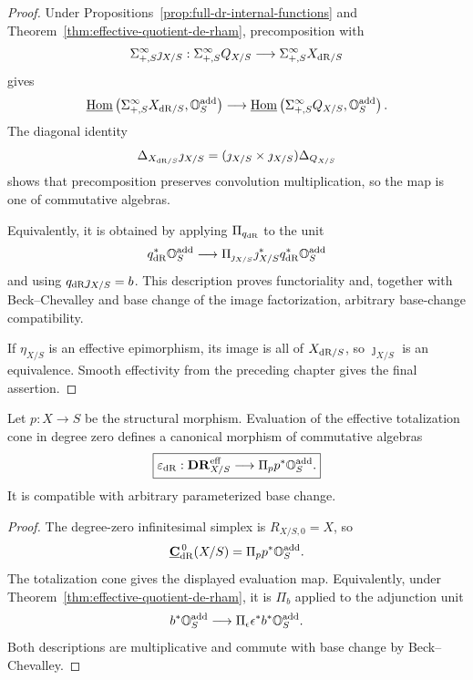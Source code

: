 \begin{proof}
Under Propositions~\ref{prop:full-dr-internal-functions} and
Theorem~\ref{thm:effective-quotient-de-rham}, precomposition with
\[
    \Sigma^\infty_{+,S}\jmath_{X/S}:
    \Sigma^\infty_{+,S}Q_{X/S}
    \longrightarrow
    \Sigma^\infty_{+,S}X_{\mathrm{dR}/S}
\]
gives
\[
    \underline{\operatorname{Hom}}
    \left(
        \Sigma^\infty_{+,S}X_{\mathrm{dR}/S},\mathbb O_S^{\mathrm{add}}
    \right)
    \longrightarrow
    \underline{\operatorname{Hom}}
    \left(
        \Sigma^\infty_{+,S}Q_{X/S},\mathbb O_S^{\mathrm{add}}
    \right).
\]
The diagonal identity
\[
    \Delta_{X_{\mathrm{dR}/S}}\jmath_{X/S}
    =
    (\jmath_{X/S}\times\jmath_{X/S})\Delta_{Q_{X/S}}
\]
shows that precomposition preserves convolution multiplication, so the map is one of commutative
algebras.

Equivalently, it is obtained by applying \(\Pi_{q_{\mathrm{dR}}}\) to the unit
\[
    q_{\mathrm{dR}}^*\mathbb O_S^{\mathrm{add}}
    \longrightarrow
    \Pi_{\jmath_{X/S}}\jmath_{X/S}^*q_{\mathrm{dR}}^*\mathbb O_S^{\mathrm{add}}
\]
and using \(q_{\mathrm{dR}}\jmath_{X/S}=b\).  This description proves functoriality and, together with
Beck--Chevalley and base change of the image factorization, arbitrary base-change compatibility.

If \(\eta_{X/S}\) is an effective epimorphism, its image is all of \(X_{\mathrm{dR}/S}\), so
\(\jmath_{X/S}\) is an equivalence.  Smooth effectivity from the preceding chapter gives the final
assertion.
\end{proof}

\begin{proposition}
\label{prop:modal-de-rham-augmentation}
Let \(p:X\to S\) be the structural morphism.  Evaluation of the effective totalization cone in
degree zero defines a canonical morphism of commutative algebras
\[
\boxed{
    \varepsilon_{\mathrm{dR}}:
    \mathbf{DR}^{\mathrm{eff}}_{X/S}
    \longrightarrow
    \Pi_p p^*\mathbb O_S^{\mathrm{add}}.
}
\]
It is compatible with arbitrary parameterized base change.
\end{proposition}

\begin{proof}
The degree-zero infinitesimal simplex is \(R_{X/S,0}=X\), so
\[
    \underline{\mathbf C}_{\mathrm{dR}}^{\,0}(X/S)
    =
    \Pi_p p^*\mathbb O_S^{\mathrm{add}}.
\]
The totalization cone gives the displayed evaluation map.  Equivalently, under
Theorem~\ref{thm:effective-quotient-de-rham}, it is \(\Pi_b\) applied to the adjunction unit
\[
    b^*\mathbb O_S^{\mathrm{add}}
    \longrightarrow
    \Pi_\epsilon\epsilon^*b^*\mathbb O_S^{\mathrm{add}}.
\]
Both descriptions are multiplicative and commute with base change by Beck--Chevalley.
\end{proof}


